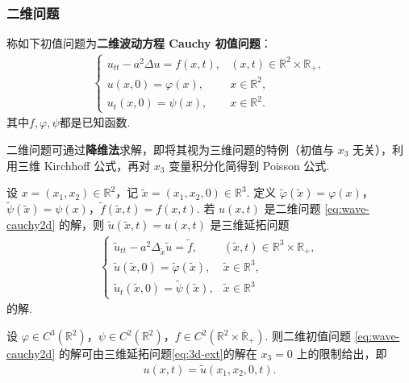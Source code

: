 \documentclass[../../main.tex]{subfiles}%
\begin{document}
\subsubsection{二维问题}

\begin{definition}
称如下初值问题为\textbf{二维波动方程 Cauchy 初值问题}：
\begin{align}
\begin{cases}
u_{tt}-a^2\Delta u=f(x,t), & (x,t)\in\mathbb{R}^2\times\mathbb{R}_+, \\
u(x,0)=\varphi(x), & x\in\mathbb{R}^2, \\
u_t(x,0)=\psi(x), & x\in\mathbb{R}^2.
\end{cases} \label{eq:wave-cauchy2d}
\end{align}
其中$f,\varphi,\psi$都是已知函数.
\end{definition}
\begin{remark}
二维问题可通过\textbf{降维法}求解，即将其视为三维问题的特例（初值与 $x_3$ 无关），利用三维 Kirchhoff 公式，再对 $x_3$ 变量积分化简得到 Poisson 公式.
\end{remark}

\begin{proposition}
设 $x=(x_1,x_2)\in\mathbb{R}^2$，记 $\tilde{x}=(x_1,x_2,0)\in\mathbb{R}^3$. 定义 $\tilde{\varphi}(\tilde{x})=\varphi(x)$，$\tilde{\psi}(\tilde{x})=\psi(x)$，$\tilde{f}(\tilde{x},t)=f(x,t)$. 若 $u(x,t)$ 是二维问题 \eqref{eq:wave-cauchy2d} 的解，则 $\tilde{u}(\tilde{x},t)=u(x,t)$ 是三维延拓问题
\begin{align}
\begin{cases}
\tilde{u}_{tt}-a^2\Delta_{\tilde{x}}\tilde{u}=\tilde{f}, & (\tilde{x},t)\in\mathbb{R}^3\times\mathbb{R}_+, \\
\tilde{u}(\tilde{x},0)=\tilde{\varphi}(\tilde{x}), & \tilde{x}\in\mathbb{R}^3, \\
\tilde{u}_t(\tilde{x},0)=\tilde{\psi}(\tilde{x}), & \tilde{x}\in\mathbb{R}^3
\end{cases} \label{eq:3d-ext}
\end{align}
的解.
\end{proposition}

\begin{proposition}[降维法]\label{proposition:多维波动方程降维法}
设 $\varphi\in C^3(\mathbb{R}^2)$，$\psi\in C^2(\mathbb{R}^2)$，$f\in C^2(\mathbb{R}^2\times\overline{\mathbb{R}}_+)$. 则二维初值问题 \eqref{eq:wave-cauchy2d} 的解可由三维延拓问题\eqref{eq:3d-ext}的解在 $x_3=0$ 上的限制给出，即
\begin{align}
u(x,t)=\tilde{u}(x_1,x_2,0,t). \label{eq:dim-reduction}
\end{align}
\end{proposition}
\end{document}
